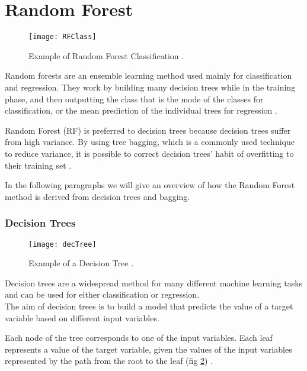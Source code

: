 \clearpage

\section{Random Forest} \label{random_forest}


\begin{figure}[H]
	\centering
	\texttt{[image: RFClass]}
	\caption{Example of Random Forest Classification \cite{medium:RF}.}
	\label{fig:RFClass}
\end{figure}

Random forests are an ensemble learning method used mainly for classification and regression. They work by building many decision trees while in the training phase, and then outputting the class that is the mode of the classes for classification, or the mean prediction of the individual trees for regression \cite{wiki:randomforest}\cite{RDF}.

Random Forest (RF) is preferred to decision trees because decision trees suffer from high variance. By using tree bagging, which is a commonly used technique to reduce variance, it is possible to correct decision trees' habit of overfitting to their training set \cite{ESL}.

In the following paragraphs we will give an overview of how the Random Forest method is derived from decision trees and bagging.

\clearpage

\subsubsection{Decision Trees}
\begin{figure}[H]
	\centering
	\texttt{[image: decTree]}
	\caption{Example of a Decision Tree \cite{KDNrf}.}
	\label{fig:decTree}
\end{figure}

Decision trees are a widespread method for many different machine learning tasks and can be used for either classification or regression.\\
The aim of decision trees is to build a model that predicts the value of a target variable based on different input variables. 

Each node of the tree corresponds to one of the input variables. Each leaf represents a value of the target variable, given the values of the input variables represented by the path from the root to the leaf (fig \ref{fig:decTree}) \cite{wiki:DT}.

